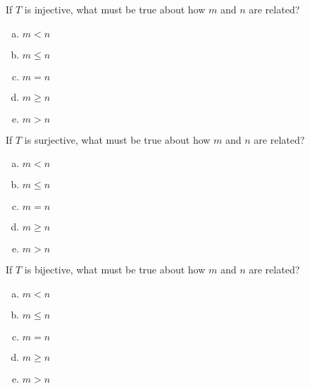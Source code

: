 \begin{applicationActivities}{2}{22}
\begin{activity}{0}
If $T$ is injective, what must be true about how $m$ and $n$ are related?
\begin{enumerate}[(a)]
\item $m<n$
\item $m \leq n$
\item $m=n$
\item $m \geq n$
\item $m>n$
\end{enumerate}
\end{activity}

\begin{activity}{0}
If $T$ is surjective, what must be true about how $m$ and $n$ are related?
\begin{enumerate}[(a)]
\item $m<n$
\item $m \leq n$
\item $m=n$
\item $m \geq n$
\item $m>n$
\end{enumerate}
\end{activity}

\begin{activity}{0}
  If $T$ is bijective, what must be true about how $m$ and $n$ are related?
\begin{enumerate}[(a)]
\item $m<n$
\item $m \leq n$
\item $m=n$
\item $m \geq n$
\item $m>n$
\end{enumerate}
\end{activity}

\end{applicationActivities}
